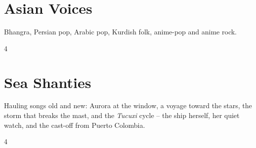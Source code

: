 \documentclass[a4paper,landscape]{memoir}
\begin{document}
\chapter{Asian Voices}
Bhangra, Persian pop, Arabic pop, Kurdish folk, anime-pop and anime rock.
\clearpage\begin{multicols*}{4}
\end{multicols*}

\chapter{Sea Shanties}
Hauling songs old and new: Aurora at the window, a voyage toward the stars, the storm that breaks the mast, and the \emph{Tucuxi} cycle -- the ship herself, her quiet watch, and the cast-off from Puerto Colombia.
\clearpage\begin{multicols*}{4}
\end{multicols*}
\end{document}
